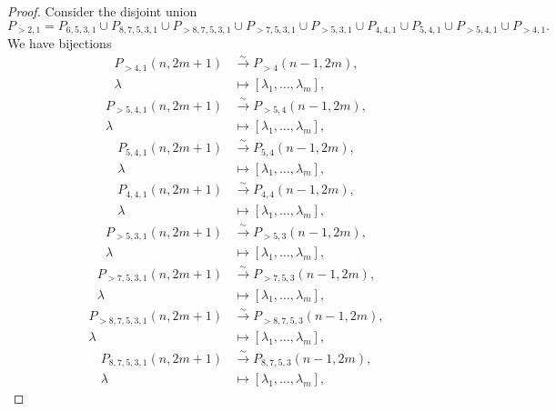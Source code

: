 \documentclass[a4paper, 12pt, reqno]{amsart}
\theoremstyle{remark}
\numberwithin{equation}{subsection}
\begin{document}
\begin{proof}
  Consider the disjoint union
  \begin{equation*}
    P_{>2, 1} = P_{6, 5, 3, 1} \cup P_{8, 7, 5, 3, 1} \cup P_{>8, 7, 5, 3, 1} \cup P_{>7, 5, 3, 1} \cup P_{>5, 3, 1} \cup P_{4, 4, 1} \cup P_{5, 4, 1} \cup P_{>5, 4, 1} \cup P_{>4, 1}.
  \end{equation*}
  We have bijections
  \begin{align*}
    P_{>4, 1}(n, 2m + 1) &\xrightarrow{\sim} P_{>4}(n - 1, 2m), \\
    \lambda &\mapsto [\lambda_1, \dots, \lambda_m],
  \end{align*}
  \begin{align*}
    P_{>5, 4, 1}(n, 2m + 1) &\xrightarrow{\sim} P_{>5, 4}(n - 1, 2m), \\
    \lambda &\mapsto [\lambda_1, \dots, \lambda_m],
  \end{align*}
  \begin{align*}
    P_{5, 4, 1}(n, 2m + 1) &\xrightarrow{\sim} P_{5, 4}(n - 1, 2m), \\
    \lambda &\mapsto [\lambda_1, \dots, \lambda_m],
  \end{align*}
  \begin{align*}
    P_{4, 4, 1}(n, 2m + 1) &\xrightarrow{\sim} P_{4, 4}(n - 1, 2m), \\
    \lambda &\mapsto [\lambda_1, \dots, \lambda_m],
  \end{align*}
  \begin{align*}
    P_{>5, 3, 1}(n, 2m + 1) &\xrightarrow{\sim} P_{>5, 3}(n - 1, 2m), \\
    \lambda &\mapsto [\lambda_1, \dots, \lambda_m],
  \end{align*}
  \begin{align*}
    P_{>7, 5, 3, 1}(n, 2m + 1) &\xrightarrow{\sim} P_{>7, 5, 3}(n - 1, 2m), \\
    \lambda &\mapsto [\lambda_1, \dots, \lambda_m],
  \end{align*}
  \begin{align*}
    P_{>8, 7, 5, 3, 1}(n, 2m + 1) &\xrightarrow{\sim} P_{>8, 7, 5, 3}(n - 1, 2m), \\
    \lambda &\mapsto [\lambda_1, \dots, \lambda_m],
  \end{align*}
  \begin{align*}
    P_{8, 7, 5, 3, 1}(n, 2m + 1) &\xrightarrow{\sim} P_{8, 7, 5, 3}(n - 1, 2m), \\
    \lambda &\mapsto [\lambda_1, \dots, \lambda_m],
  \end{align*}

\end{proof}
\end{document}
